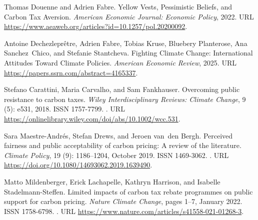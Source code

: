 \documentclass[12pt,english]{article}
\begin{document}
\begin{thebibliography}{55}
  Thomas Douenne and Adrien Fabre.
  \newblock Yellow {{Vests}}, {{Pessimistic Beliefs}}, and {{Carbon Tax
    Aversion}}.
  \newblock \emph{American Economic Journal: Economic Policy}, 2022.
  \newblock URL \url{https://www.aeaweb.org/articles?id=10.1257/pol.20200092}.
  
  Antoine Dechezlepr{\^e}tre, Adrien Fabre, Tobias Kruse, Bluebery Planterose,
    Ana Sanchez~Chico, and Stefanie Stantcheva.
  \newblock Fighting {{Climate Change}}: {{International Attitudes Toward Climate
    Policies}}.
  \newblock \emph{American Economic Review}, 2025.
  \newblock URL \url{https://papers.ssrn.com/abstract=4165337}.
  
  Stefano Carattini, Maria Carvalho, and Sam Fankhauser.
  \newblock Overcoming public resistance to carbon taxes.
  \newblock \emph{Wiley Interdisciplinary Reviews: Climate Change}, 9
    (5): e531, 2018.
  \newblock ISSN 1757-7799.
  \newblock {}.
  \newblock URL \url{https://onlinelibrary.wiley.com/doi/abs/10.1002/wcc.531}.
  
  Sara {Maestre-Andr{\'e}s}, Stefan Drews, and Jeroen van~den Bergh.
  \newblock Perceived fairness and public acceptability of carbon pricing: A
    review of the literature.
  \newblock \emph{Climate Policy}, 19 (9): 1186--1204, October
    2019.
  \newblock ISSN 1469-3062.
  \newblock {}.
  \newblock URL \url{https://doi.org/10.1080/14693062.2019.1639490}.
  
  Matto Mildenberger, Erick Lachapelle, Kathryn Harrison, and Isabelle
    {Stadelmann-Steffen}.
  \newblock Limited impacts of carbon tax rebate programmes on public support for
    carbon pricing.
  \newblock \emph{Nature Climate Change}, pages 1--7, January 2022.
  \newblock ISSN 1758-6798.
  \newblock {}.
  \newblock URL \url{https://www.nature.com/articles/s41558-021-01268-3}.
  

\end{thebibliography}
\end{document}
